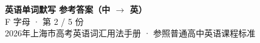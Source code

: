 \documentclass[10pt,a4paper]{article}
\begin{document}
\pagestyle{plain}

\begin{center}
{\LARGE\bfseries 英语单词默写 \quad 参考答案（中 $\to$ 英）}\\[0.22em]
{\large F 字母 · 第 2 / 5 份}\\[0.18em]
{\small 2026年上海市高考英语词汇用法手册 · 参照普通高中英语课程标准}
\end{center}

\vspace{0.2em}
\noindent{\color{rulegray}\rule{\textwidth}{0.8pt}}

\vspace{0.35em}

\vspace{0.25em}
\renewcommand{\arraystretch}{1.32}
\end{document}
